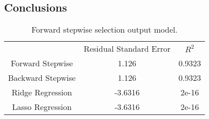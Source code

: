 \subsection{Conclusions}

\begin{table}[h]
	\centering
	\begin{tabular}{||c | c | c ||} 
						 & Residual Standard Error & $R^2$ \\
		Forward Stepwise & 1.126 & 0.9323 \\
		\hline
		Backward Stepwise & 1.126 & 0.9323 \\
		\hline
		Ridge Regression & -3.6316 & 2e-16 \\
		\hline
		Lasso Regression & -3.6316 & 2e-16 \\
		\hline
	\end{tabular}
	\caption{Forward stepwise selection output model.}
	\label{table:ForwardModelSummary}
\end{table}